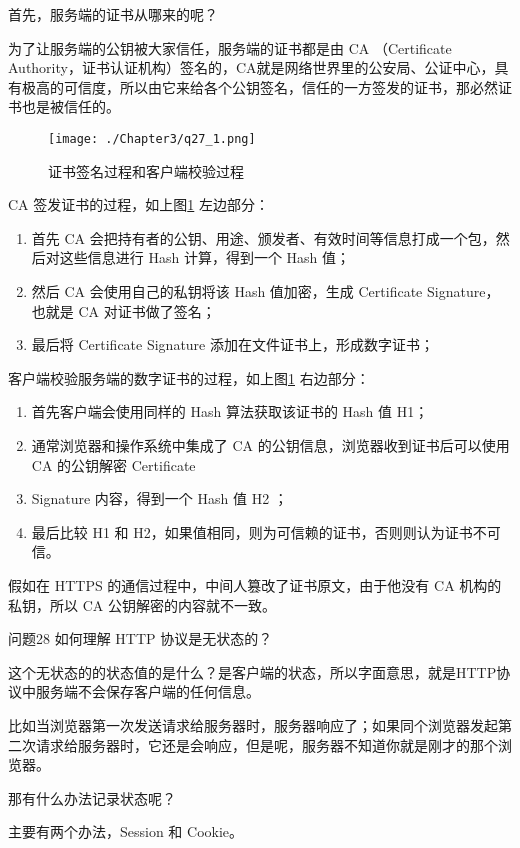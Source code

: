 \documentclass[cn,11pt,color=blue,lang=cn]{elegantbook}
\begin{document}
\begin{solution}
首先，服务端的证书从哪来的呢？

为了让服务端的公钥被⼤家信任，服务端的证书都是由 CA （Certificate Authority，证书认证机构）签名的，CA就是⽹络世界⾥的公安局、公证中⼼，具有极⾼的可信度，所以由它来给各个公钥签名，信任的⼀⽅签发的证书，那必然证书也是被信任的。

\begin{figure}[htbp]
\centering
\texttt{[image: ./Chapter3/q27\_1.png]}
\caption{证书签名过程和客户端校验过程}
\label{fig27_1}
\end{figure}

CA 签发证书的过程，如上图\ref{fig27_1} 左边部分：
\begin{enumerate}
	\item ⾸先 CA 会把持有者的公钥、⽤途、颁发者、有效时间等信息打成⼀个包，然后对这些信息进⾏ Hash 计算，得到⼀个 Hash 值；
	\item 然后 CA 会使⽤⾃⼰的私钥将该 Hash 值加密，⽣成 Certificate Signature，也就是 CA 对证书做了签名；
	\item 最后将 Certificate Signature 添加在⽂件证书上，形成数字证书；
\end{enumerate}

客户端校验服务端的数字证书的过程，如上图\ref{fig27_1} 右边部分：
\begin{enumerate}
	\item ⾸先客户端会使⽤同样的 Hash 算法获取该证书的 Hash 值 H1；
	\item 通常浏览器和操作系统中集成了 CA 的公钥信息，浏览器收到证书后可以使⽤ CA 的公钥解密 Certificate
	\item Signature 内容，得到⼀个 Hash 值 H2 ；
	\item 最后⽐较 H1 和 H2，如果值相同，则为可信赖的证书，否则则认为证书不可信。
\end{enumerate}
假如在 HTTPS 的通信过程中，中间人篡改了证书原文，由于他没有 CA 机构的私钥，所以 CA 公钥解密的内容就不一致。

\end{solution}


\begin{custom}{问题28}
如何理解 HTTP 协议是无状态的？
\end{custom}
\begin{solution}
这个无状态的的状态值的是什么？是客户端的状态，所以字面意思，就是HTTP协议中服务端不会保存客户端的任何信息。

比如当浏览器第一次发送请求给服务器时，服务器响应了；如果同个浏览器发起第二次请求给服务器时，它还是会响应，但是呢，服务器不知道你就是刚才的那个浏览器。

那有什么办法记录状态呢？

主要有两个办法，Session 和 Cookie。
\end{solution}
\end{document}

